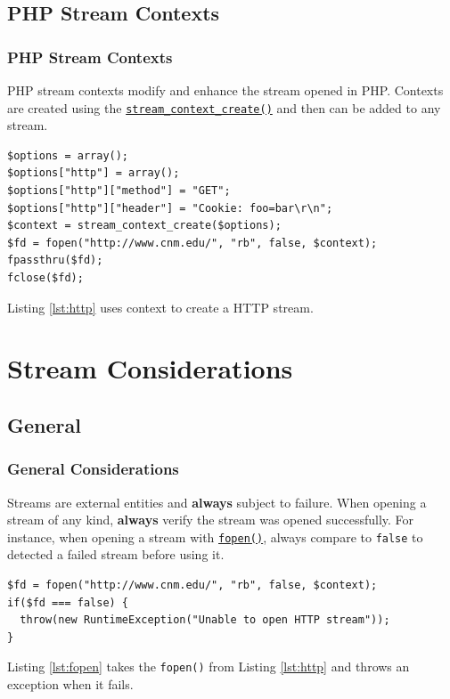 \documentclass[aspectratio=169]{beamer}
\begin{document}
\subsection{PHP Stream Contexts}
\begin{frame}[fragile]
\frametitle{PHP Stream Contexts}
PHP stream contexts modify and enhance the stream opened in PHP. Contexts are created using the \href{http://php.net/manual/en/function.stream-context-create.php}{\texttt{stream\_context\_create()}} and then can be added to any stream.
\begin{lstlisting}[caption=Using Context to Create an HTTP Stream,label=lst:http]
$options = array();
$options["http"] = array();
$options["http"]["method"] = "GET";
$options["http"]["header"] = "Cookie: foo=bar\r\n";
$context = stream_context_create($options);
$fd = fopen("http://www.cnm.edu/", "rb", false, $context);
fpassthru($fd);
fclose($fd);
\end{lstlisting}
Listing \ref{lst:http} uses context to create a HTTP stream.
\end{frame}

\section{Stream Considerations}
\subsection{General}
\begin{frame}[fragile]
\frametitle{General Considerations}
Streams are external entities and \textbf{always} subject to failure. When opening a stream of any kind, \textbf{always} verify the stream was opened successfully. For instance, when opening a stream with \href{http://php.net/manual/en/function.fopen.php}{\texttt{fopen()}}, always compare to \texttt{false} to detected a failed stream before using it.
\begin{lstlisting}[caption=Verifying a Stream,label=lst:fopen]
$fd = fopen("http://www.cnm.edu/", "rb", false, $context);
if($fd === false) {
  throw(new RuntimeException("Unable to open HTTP stream"));
}
\end{lstlisting}
Listing \ref{lst:fopen} takes the \texttt{fopen()} from Listing \ref{lst:http} and throws an exception when it fails.
\end{frame}
\end{document}
